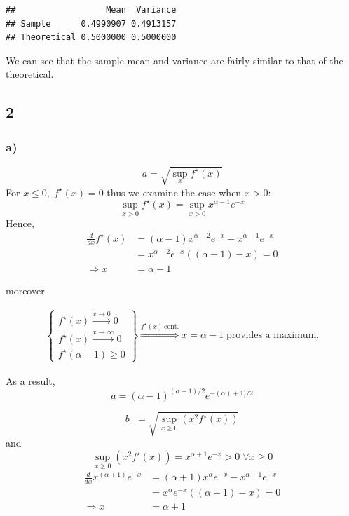\documentclass[
]{article}
\begin{document}
\begin{verbatim}
##                  Mean  Variance
## Sample      0.4990907 0.4913157
## Theoretical 0.5000000 0.5000000
\end{verbatim}

We can see that the sample mean and variance are fairly similar to that
of the theoretical.

\hypertarget{section-3}{%
\subsection{2}\label{section-3}}

\hypertarget{a-1}{%
\subsubsection{a)}\label{a-1}}

\[
a = \sqrt{\sup_{x} f^{\star}(x)} 
\] For \(x≤0, \; f^{\star}(x) = 0\) thus we examine the case when
\(x>0\): \[
\sup_{x>0}f^{\star}(x) = \sup_{x>0}x^{\alpha-1}e^{-x}
\] Hence, \begin{align*}
\frac{d}{dx}f^{\star}(x) &= (\alpha - 1)x^{\alpha-2}e^{-x} - x^{\alpha-1}e^{-x} \\
&= x^{\alpha-2}e^{-x}((\alpha - 1) - x) = 0 \\
\Longrightarrow x &= \alpha - 1
\end{align*}

moreover

\begin{align*}
\begin{Bmatrix}
f^{\star}(x) \overset{x \rightarrow 0}{\longrightarrow} 0 \\
f^{\star}(x) \overset{x \rightarrow \infty}{\longrightarrow} 0 \\
f^{\star}(\alpha-1) ≥ 0
\end{Bmatrix} 
\overset{f^{\star}(x) \, \text{cont.}}{\Longrightarrow} x = \alpha-1 \; \text{provides a maximum.}
\end{align*}

As a result, \[
a = (\alpha -1)^{(\alpha -1)/2}e^{-(\alpha)+1)/2}
\]

\[
b_+ = \sqrt{\sup_{x≥0}(x^2f^{\star}(x))} 
\] and \[
\sup_{x≥0}(x^2f^{\star}(x)) = x^{\alpha+1}e^{-x} > 0 \; \forall x≥0
\] \begin{align*}
\frac{d}{dx} x^{(\alpha + 1)}e^{-x}
&= (\alpha+1)x^{\alpha}e^{-x} - x^{\alpha+1}e^{-x} \\
&= x^{\alpha}e^{-x}((\alpha + 1) - x) = 0 \\
\Longrightarrow x &= \alpha + 1
\end{align*}
\end{document}
